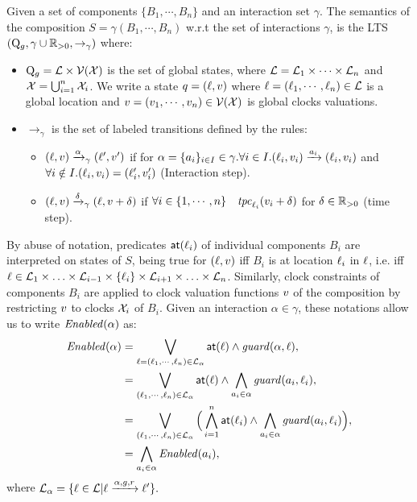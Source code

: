 \begin{definition}
  \label{pt:comp_sem}
  Given a set of components $\{B_1,\cdots,B_n\}$ and an interaction set $\gamma$.
  The semantics of the composition $S =\gamma(B_1,\cdots,B_n)$ w.r.t the set of interactions 
  $\gamma$, is the LTS $(\mathrm{Q}_g,\gamma\cup\mathbb R_{> 0},\to_{\gamma})$ where:
\begin{itemize}[leftmargin=5mm]
  \item $\mathrm{Q}_g=\mathcal{L}\times\mathcal{V}(\mathcal{X})$ is the set of global states, where $\mathcal{L}=\mathcal{L}_1\times
  \cdots\times\mathcal{L}_n$ and $\mathcal{X}=\bigcup^n_{i=1}\mathcal{X}_i$. We write a state $q=(\ell,v)$
  where $\ell=(\ell_1,\cdots,\ell_n)\in\mathcal{L}$ is a global location and $v=(v_1,
  \cdots,v_n)\in\mathcal{V}(\mathcal{X})$ is global clocks valuations.
  \item $\to_{\gamma}$ is the set of labeled transitions defined by the rules: 
  \begin{itemize}
    \item $(\ell,v)\xrightarrow{\alpha}_{\gamma}(\ell',v')$ if for $\alpha=\{a_i\}_{i\in I}\in\gamma.
      \forall i\in I.(\ell_i,v_i)\xrightarrow{a_i}(\ell_i,v_i)$ and $\forall i \notin I.(\ell_i,v_i)=(\ell_i',v'_i)$
      (Interaction step).
        \item $(\ell,v)\xrightarrow{\delta}_{\gamma}(\ell,v+\delta)$ if
          $\forall i\in\{1,\cdots,n\}\quad \mathit{tpc}_{\ell_i}(v_i+\delta)$ for $\delta\in\mathbb R_{> 0}$ (time step).
      \end{itemize}
  \end{itemize}
\end{definition}

By abuse of notation, predicates $\textnormal{\textsf{at}}(\ell_i)$ of individual components $B_i$ are interpreted on states of $S$,
being true for $(\ell,v)$ iff $B_i$ is at location $\ell_i$ in $\ell$, i.e. iff $\ell\in
\mathcal{L}_1\times\ldots\times\mathcal{L}_{i-1}\times\{\ell_i\}\times\mathcal{L}_{i+1}\times\ldots\times\mathcal{L}_n$.
Similarly, clock constraints of components $B_i$ are applied to clock valuation functions $v$ 
of the composition by restricting $v$ to clocks $\mathcal{X}_i$ of $B_i$.
Given an interaction $\alpha\in\gamma$, these notations allow us to write $\mathit{Enabled}(\alpha)$ as:
\begin{align*}
  \mathit{Enabled}(\alpha) &= \bigvee_{\ell=(\ell_1,\cdots,\ell_n)\in\mathcal{L}_{\alpha}} \textnormal{\textsf{at}}(\ell)\wedge \mathit{guard}(\alpha,\ell),\\
                   &= \bigvee_{(\ell_1,\cdots,\ell_n)\in\mathcal{L}_{\alpha}} \textnormal{\textsf{at}}(\ell)\wedge \bigwedge_{a_i\in\alpha}\mathit{guard}(a_i,\ell_i),\\
                   &= \bigvee_{(\ell_1,\cdots,\ell_n)\in\mathcal{L}_{\alpha}} \Big(\bigwedge_{i=1}^n\textnormal{\textsf{at}}(\ell_i)\wedge \bigwedge_{a_i\in\alpha}\mathit{guard}(a_i,\ell_i)\Big),\\
                   &= \bigwedge_{a_i\in\alpha} \mathit{Enabled}(a_i),
\end{align*}
where $\mathcal{L}_{\alpha}=\{\ell\in\mathcal{L}|\ell\xrightarrow{\alpha,g,r}\ell'\}.$


